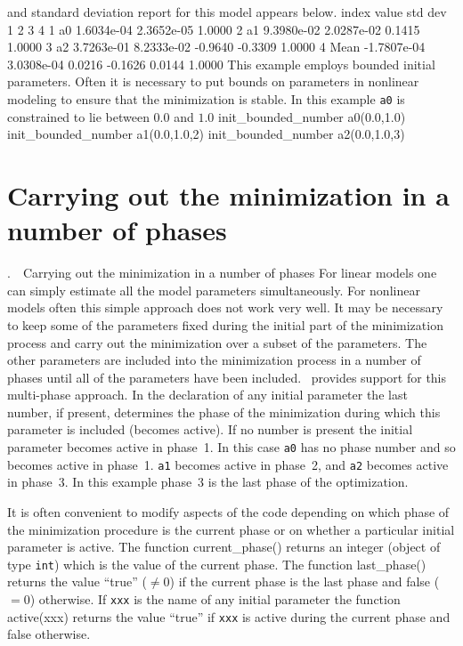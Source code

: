 \documentclass[12pt]{book}
\makeatletter
\def\mysection#1{\section{#1}{\bigbf \medbreak\noindent\number\c@chapter.\number\c@section\ \ #1\medbreak}}
\makeatother
\begin{document}
and standard deviation report for this model appears below. 
\beginexample
 index         value      std dev       1       2       3       4   
    1   a0    1.6034e-04 2.3652e-05  1.0000
    2   a1    9.3980e-02 2.0287e-02  0.1415  1.0000
    3   a2    3.7263e-01 8.2333e-02 -0.9640 -0.3309  1.0000
    4   Mean -1.7807e-04 3.0308e-04  0.0216 -0.1626  0.0144  1.0000
\endexample
This example employs bounded initial parameters.
Often it is necessary to put bounds on parameters in nonlinear
modeling to ensure that the minimization is stable.
In this example {\tt a0} is constrained to lie between $0.0$ and $1.0$
\beginexample
  init_bounded_number a0(0.0,1.0)
  init_bounded_number a1(0.0,1.0,2)
  init_bounded_number a2(0.0,1.0,3)
\endexample
\mysection{Carrying out the minimization in a number of phases}
For linear models one can simply estimate all the model parameters
simultaneously. For nonlinear models often this simple approach does 
not work very well. It may be necessary to keep some of the
parameters fixed during the initial part of the minimization 
process and carry out the minimization over a subset of the parameters.
The other parameters are included into the minimization
process in a number of phases until all of the parameters have
been included. \ADM\ provides support for this multi-phase
approach. In the declaration of any initial parameter the last number,
if present, determines the phase of the minimization 
during which this parameter is included (becomes active). If
no number is present the initial parameter 
becomes active in phase~1.  
In this case {\tt a0} has no phase number and so becomes
active in phase~1. {\tt a1} becomes active in phase~2, and
{\tt a2} becomes active in phase~3. In this example
phase~3 is the last phase of the optimization.

It is often convenient to modify aspects of the code depending on which 
phase of the minimization procedure is the current phase or on whether
a particular initial parameter is active. The function
\beginexample
current_phase()
\endexample
\noindent returns an integer (object of type {\tt int}) which is the
value of the current phase.
The function
\beginexample 
last_phase()
\endexample
\noindent returns the value ``true'' ($\ne 0$) if the current phase is the
last phase and false ($=0$) otherwise. 
If {\tt xxx} is the name of any initial parameter the function
\beginexample 
active(xxx) 
\endexample
\noindent returns the value ``true'' if {\tt xxx} is active
during the  current phase and false otherwise.
\end{document}
